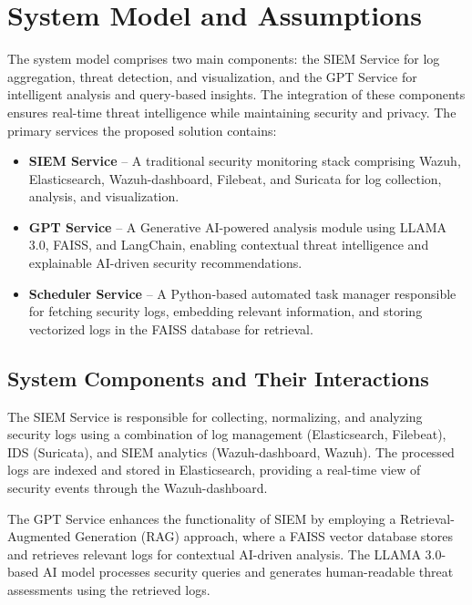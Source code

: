 \section{System Model and Assumptions}
\label{sec_system_model_and_assumptions}

The system model comprises two main components: the SIEM Service for log aggregation, threat detection, and visualization, and the GPT Service for intelligent analysis and query-based insights. The integration of these components ensures real-time threat intelligence while maintaining security and privacy. The primary services the proposed solution contains:

\begin{itemize}
    \item \textbf{SIEM Service} -- A traditional security monitoring stack comprising Wazuh, Elasticsearch, Wazuh-dashboard, Filebeat, and Suricata for log collection, analysis, and visualization.
    \item \textbf{GPT Service} -- A Generative AI-powered analysis module using LLAMA 3.0, FAISS, and LangChain, enabling contextual threat intelligence and explainable AI-driven security recommendations.
    \item \textbf{Scheduler Service} -- A Python-based automated task manager responsible for fetching security logs, embedding relevant information, and storing vectorized logs in the FAISS database for retrieval.
\end{itemize}

\subsection{System Components and Their Interactions}
\label{subsec_system_components_and_interactions}

The SIEM Service is responsible for collecting, normalizing, and analyzing security logs using a combination of log management (Elasticsearch, Filebeat), IDS (Suricata), and SIEM analytics (Wazuh-dashboard, Wazuh). The processed logs are indexed and stored in Elasticsearch, providing a real-time view of security events through the Wazuh-dashboard.

The GPT Service enhances the functionality of SIEM by employing a Retrieval-Augmented Generation (RAG) approach, where a FAISS vector database stores and retrieves relevant logs for contextual AI-driven analysis. The LLAMA 3.0-based AI model processes security queries and generates human-readable threat assessments using the retrieved logs.

